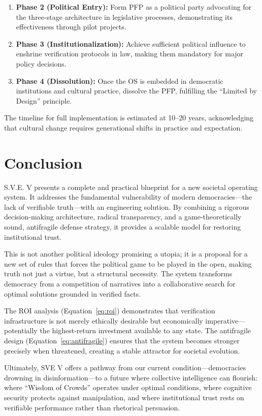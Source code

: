 \documentclass[11pt,a4paper]{article}
\begin{document}
\begin{small}
\begin{enumerate}
    \item \textbf{Phase 2 (Political Entry):} Form PFP as a political party advocating for the three-stage architecture in legislative processes, demonstrating its effectiveness through pilot projects.
    
    \item \textbf{Phase 3 (Institutionalization):} Achieve sufficient political influence to enshrine verification protocols in law, making them mandatory for major policy decisions.
    
    \item \textbf{Phase 4 (Dissolution):} Once the OS is embedded in democratic institutions and cultural practice, dissolve the PFP, fulfilling the ``Limited by Design'' principle.
\end{enumerate}

The timeline for full implementation is estimated at 10--20 years, acknowledging that cultural change requires generational shifts in practice and expectation.

\section{Conclusion}
S.V.E. V presents a complete and practical blueprint for a new societal operating system. It addresses the fundamental vulnerability of modern democracies—the lack of verifiable truth—with an engineering solution. By combining a rigorous decision-making architecture, radical transparency, and a game-theoretically sound, antifragile defense strategy, it provides a scalable model for restoring institutional trust.

This is not another political ideology promising a utopia; it is a proposal for a new set of rules that forces the political game to be played in the open, making truth not just a virtue, but a structural necessity. The system transforms democracy from a competition of narratives into a collaborative search for optimal solutions grounded in verified facts.

The ROI analysis (Equation~\eqref{eq:roi}) demonstrates that verification infrastructure is not merely ethically desirable but economically imperative—potentially the highest-return investment available to any state. The antifragile design (Equation~\eqref{eq:antifragile}) ensures that the system becomes stronger precisely when threatened, creating a stable attractor for societal evolution.

Ultimately, SVE V offers a pathway from our current condition—democracies drowning in disinformation—to a future where collective intelligence can flourish: where ``Wisdom of Crowds'' operates under optimal conditions, where cognitive security protects against manipulation, and where institutional trust rests on verifiable performance rather than rhetorical persuasion.


\end{small}
\end{document}
